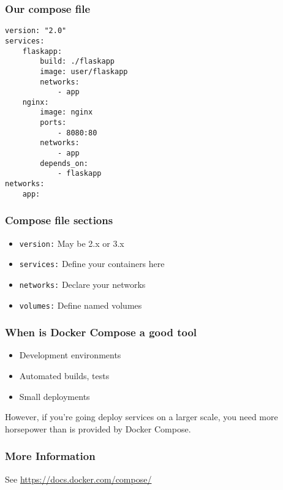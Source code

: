 \documentclass[10pt]{beamer}
\begin{document}
\begin{frame}[fragile]
    \frametitle{Our compose file}
    
    \begin{verbatim}
version: "2.0"
services:
    flaskapp:
        build: ./flaskapp
        image: user/flaskapp
        networks:
            - app
    nginx:
        image: nginx
        ports:
            - 8080:80
        networks:
            - app
        depends_on:
            - flaskapp
networks:
    app:
    \end{verbatim}
\end{frame}

\begin{frame}
  \frametitle{Compose file sections}
   \begin{itemize}
     \item \texttt{version:} May be 2.x or 3.x   
     \item \texttt{services:} Define your containers here
     \item \texttt{networks:} Declare your networks
     \item \texttt{volumes:} Define named volumes
   \end{itemize}
\end{frame}

\begin{frame}
  \frametitle{When is Docker Compose a good tool}
   
   \begin{itemize}
     \item Development environments    
     \item Automated builds, tests
     \item Small deployments
   \end{itemize}
   
 However, if you're going deploy services on a larger scale, you need more horsepower than is provided by Docker Compose.

\end{frame}


\begin{frame}
  \frametitle{More Information}
  
  See \url{https://docs.docker.com/compose/}
\end{frame}
\end{document}

